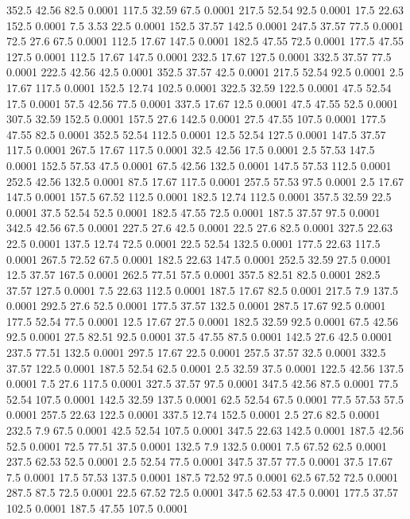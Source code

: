 352.5	42.56	82.5	0.0001
117.5	32.59	67.5	0.0001
217.5	52.54	92.5	0.0001
17.5	22.63	152.5	0.0001
7.5	3.53	22.5	0.0001
152.5	37.57	142.5	0.0001
247.5	37.57	77.5	0.0001
72.5	27.6	67.5	0.0001
112.5	17.67	147.5	0.0001
182.5	47.55	72.5	0.0001
177.5	47.55	127.5	0.0001
112.5	17.67	147.5	0.0001
232.5	17.67	127.5	0.0001
332.5	37.57	77.5	0.0001
222.5	42.56	42.5	0.0001
352.5	37.57	42.5	0.0001
217.5	52.54	92.5	0.0001
2.5	17.67	117.5	0.0001
152.5	12.74	102.5	0.0001
322.5	32.59	122.5	0.0001
47.5	52.54	17.5	0.0001
57.5	42.56	77.5	0.0001
337.5	17.67	12.5	0.0001
47.5	47.55	52.5	0.0001
307.5	32.59	152.5	0.0001
157.5	27.6	142.5	0.0001
27.5	47.55	107.5	0.0001
177.5	47.55	82.5	0.0001
352.5	52.54	112.5	0.0001
12.5	52.54	127.5	0.0001
147.5	37.57	117.5	0.0001
267.5	17.67	117.5	0.0001
32.5	42.56	17.5	0.0001
2.5	57.53	147.5	0.0001
152.5	57.53	47.5	0.0001
67.5	42.56	132.5	0.0001
147.5	57.53	112.5	0.0001
252.5	42.56	132.5	0.0001
87.5	17.67	117.5	0.0001
257.5	57.53	97.5	0.0001
2.5	17.67	147.5	0.0001
157.5	67.52	112.5	0.0001
182.5	12.74	112.5	0.0001
357.5	32.59	22.5	0.0001
37.5	52.54	52.5	0.0001
182.5	47.55	72.5	0.0001
187.5	37.57	97.5	0.0001
342.5	42.56	67.5	0.0001
227.5	27.6	42.5	0.0001
22.5	27.6	82.5	0.0001
327.5	22.63	22.5	0.0001
137.5	12.74	72.5	0.0001
22.5	52.54	132.5	0.0001
177.5	22.63	117.5	0.0001
267.5	72.52	67.5	0.0001
182.5	22.63	147.5	0.0001
252.5	32.59	27.5	0.0001
12.5	37.57	167.5	0.0001
262.5	77.51	57.5	0.0001
357.5	82.51	82.5	0.0001
282.5	37.57	127.5	0.0001
7.5	22.63	112.5	0.0001
187.5	17.67	82.5	0.0001
217.5	7.9	137.5	0.0001
292.5	27.6	52.5	0.0001
177.5	37.57	132.5	0.0001
287.5	17.67	92.5	0.0001
177.5	52.54	77.5	0.0001
12.5	17.67	27.5	0.0001
182.5	32.59	92.5	0.0001
67.5	42.56	92.5	0.0001
27.5	82.51	92.5	0.0001
37.5	47.55	87.5	0.0001
142.5	27.6	42.5	0.0001
237.5	77.51	132.5	0.0001
297.5	17.67	22.5	0.0001
257.5	37.57	32.5	0.0001
332.5	37.57	122.5	0.0001
187.5	52.54	62.5	0.0001
2.5	32.59	37.5	0.0001
122.5	42.56	137.5	0.0001
7.5	27.6	117.5	0.0001
327.5	37.57	97.5	0.0001
347.5	42.56	87.5	0.0001
77.5	52.54	107.5	0.0001
142.5	32.59	137.5	0.0001
62.5	52.54	67.5	0.0001
77.5	57.53	57.5	0.0001
257.5	22.63	122.5	0.0001
337.5	12.74	152.5	0.0001
2.5	27.6	82.5	0.0001
232.5	7.9	67.5	0.0001
42.5	52.54	107.5	0.0001
347.5	22.63	142.5	0.0001
187.5	42.56	52.5	0.0001
72.5	77.51	37.5	0.0001
132.5	7.9	132.5	0.0001
7.5	67.52	62.5	0.0001
237.5	62.53	52.5	0.0001
2.5	52.54	77.5	0.0001
347.5	37.57	77.5	0.0001
37.5	17.67	7.5	0.0001
17.5	57.53	137.5	0.0001
187.5	72.52	97.5	0.0001
62.5	67.52	72.5	0.0001
287.5	87.5	72.5	0.0001
22.5	67.52	72.5	0.0001
347.5	62.53	47.5	0.0001
177.5	37.57	102.5	0.0001
187.5	47.55	107.5	0.0001
